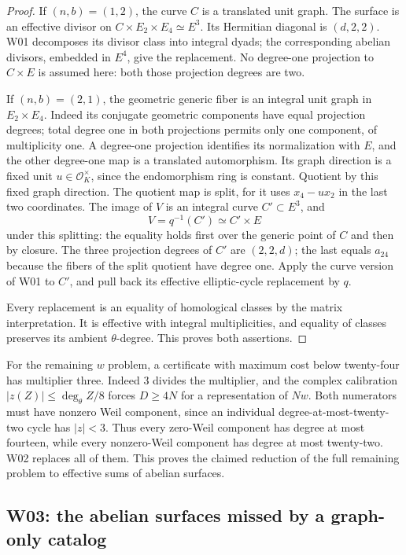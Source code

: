 \begin{proof}
If $(n,b)=(1,2)$, the curve $C$ is a translated unit graph. The surface is an effective divisor on $C\times E_2\times E_4\simeq E^3$. Its Hermitian diagonal is $(d,2,2)$. W01 decomposes its divisor class into integral dyads; the corresponding abelian divisors, embedded in $E^4$, give the replacement. No degree-one projection to $C\times E$ is assumed here: both those projection degrees are two.

If $(n,b)=(2,1)$, the geometric generic fiber is an integral unit graph in $E_2\times E_4$. Indeed its conjugate geometric components have equal projection degrees; total degree one in both projections permits only one component, of multiplicity one. A degree-one projection identifies its normalization with $E$, and the other degree-one map is a translated automorphism. Its graph direction is a fixed unit $u\in\mathcal O_K^\times$, since the endomorphism ring is constant. Quotient by this fixed graph direction. The quotient map is split, for it uses $x_4-u x_2$ in the last two coordinates. The image of $V$ is an integral curve $C'\subset E^3$, and
\[
V=q^{-1}(C')\simeq C'\times E
\]
under this splitting: the equality holds first over the generic point of $C$ and then by closure. The three projection degrees of $C'$ are $(2,2,d)$; the last equals $a_{24}$ because the fibers of the split quotient have degree one. Apply the curve version of W01 to $C'$, and pull back its effective elliptic-cycle replacement by $q$.

Every replacement is an equality of homological classes by the matrix interpretation. It is effective with integral multiplicities, and equality of classes preserves its ambient $\theta$-degree. This proves both assertions.
\end{proof}

For the remaining $w$ problem, a certificate with maximum cost below twenty-four has multiplier three. Indeed $3$ divides the multiplier, and the complex calibration $|z(Z)|\leq\deg_\theta Z/8$ forces $D\geq4N$ for a representation of $Nw$. Both numerators must have nonzero Weil component, since an individual degree-at-most-twenty-two cycle has $|z|<3$. Thus every zero-Weil component has degree at most fourteen, while every nonzero-Weil component has degree at most twenty-two. W02 replaces all of them. This proves the claimed reduction of the full remaining problem to effective sums of abelian surfaces.

\subsection{W03: the abelian surfaces missed by a graph-only catalog}

